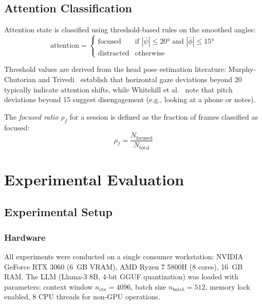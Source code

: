 \documentclass[conference]{IEEEtran}
\begin{document}
\subsection{Attention Classification}

Attention state is classified using threshold-based rules on the smoothed angles:
\begin{equation}
\text{attention} = \begin{cases} \text{focused} & \text{if } |\bar{\psi}| \leq 20° \text{ and } |\bar{\phi}| \leq 15° \\ \text{distracted} & \text{otherwise} \end{cases}
\label{eq:attention}
\end{equation}

Threshold values are derived from the head pose estimation literature: Murphy-Chutorian and Trivedi~\cite{murphy2009head} establish that horizontal gaze deviations beyond 20\textdegree{} typically indicate attention shifts, while Whitehill et al.~\cite{whitehill2014} note that pitch deviations beyond 15\textdegree{} suggest disengagement (e.g., looking at a phone or notes).

The \textit{focused ratio} $\rho_f$ for a session is defined as the fraction of frames classified as focused:
\begin{equation}
\rho_f = \frac{N_{\text{focused}}}{N_{\text{total}}}
\label{eq:focused_ratio}
\end{equation}

\section{Experimental Evaluation}
\label{sec:evaluation}

\subsection{Experimental Setup}

\subsubsection{Hardware}
All experiments were conducted on a single consumer workstation: NVIDIA GeForce RTX 3060 (6~GB VRAM), AMD Ryzen 7 5800H (8 cores), 16~GB RAM. The LLM (Llama-3 8B, 4-bit GGUF quantization) was loaded with parameters: context window $n_{ctx} = 4096$, batch size $n_{batch} = 512$, memory lock enabled, 8 CPU threads for non-GPU operations.
\end{document}
